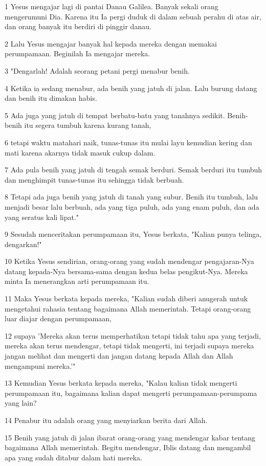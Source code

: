 \par 1 Yesus mengajar lagi di pantai Danau Galilea. Banyak sekali orang mengerumuni Dia. Karena itu Ia pergi duduk di dalam sebuah perahu di atas air, dan orang banyak itu berdiri di pinggir danau.
\par 2 Lalu Yesus mengajar banyak hal kepada mereka dengan memakai perumpamaan. Beginilah Ia mengajar mereka.
\par 3 "Dengarlah! Adalah seorang petani pergi menabur benih.
\par 4 Ketika ia sedang menabur, ada benih yang jatuh di jalan. Lalu burung datang dan benih itu dimakan habis.
\par 5 Ada juga yang jatuh di tempat berbatu-batu yang tanahnya sedikit. Benih-benih itu segera tumbuh karena kurang tanah,
\par 6 tetapi waktu matahari naik, tunas-tunas itu mulai layu kemudian kering dan mati karena akarnya tidak masuk cukup dalam.
\par 7 Ada pula benih yang jatuh di tengah semak berduri. Semak berduri itu tumbuh dan menghimpit tunas-tunas itu sehingga tidak berbuah.
\par 8 Tetapi ada juga benih yang jatuh di tanah yang subur. Benih itu tumbuh, lalu menjadi besar lalu berbuah, ada yang tiga puluh, ada yang enam puluh, dan ada yang seratus kali lipat."
\par 9 Sesudah menceritakan perumpamaan itu, Yesus berkata, "Kalian punya telinga, dengarkan!"
\par 10 Ketika Yesus sendirian, orang-orang yang sudah mendengar pengajaran-Nya datang kepada-Nya bersama-sama dengan kedua belas pengikut-Nya. Mereka minta Ia menerangkan arti perumpamaan itu.
\par 11 Maka Yesus berkata kepada mereka, "Kalian sudah diberi anugerah untuk mengetahui rahasia tentang bagaimana Allah memerintah. Tetapi orang-orang luar diajar dengan perumpamaan,
\par 12 supaya 'Mereka akan terus memperhatikan tetapi tidak tahu apa yang terjadi, mereka akan terus mendengar, tetapi tidak mengerti, ini terjadi supaya mereka jangan melihat dan mengerti dan jangan datang kepada Allah dan Allah mengampuni mereka.'"
\par 13 Kemudian Yesus berkata kepada mereka, "Kalau kalian tidak mengerti perumpamaan itu, bagaimana kalian dapat mengerti perumpamaan-perumpama yang lain?
\par 14 Penabur itu adalah orang yang menyiarkan berita dari Allah.
\par 15 Benih yang jatuh di jalan ibarat orang-orang yang mendengar kabar tentang bagaimana Allah memerintah. Begitu mendengar, Iblis datang dan mengambil apa yang sudah ditabur dalam hati mereka.
